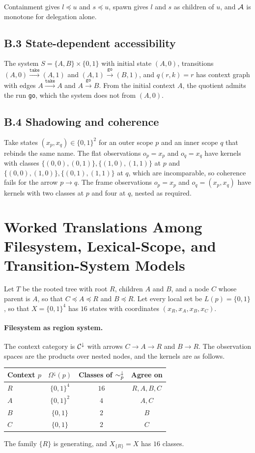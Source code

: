 Containment gives $l\preceq u$ and $s\preceq u$, spawn gives $l$ and $s$ as children of $u$, and $\mathcal A$ is monotone for delegation alone.

\subsection*{B.3 State-dependent accessibility}

The system $S=\{A,B\}\times\{0,1\}$ with initial state $(A,0)$, transitions $(A,0)\xrightarrow{\texttt{take}}(A,1)$ and $(A,1)\xrightarrow{\texttt{go}}(B,1)$, and $q(r,k)=r$ has context graph with edges $A\xrightarrow{\texttt{take}}A$ and $A\xrightarrow{\texttt{go}}B$. From the initial context $A$, the quotient admits the run \texttt{go}, which the system does not from $(A,0)$.

\subsection*{B.4 Shadowing and coherence}

Take states $(x_p,x_q)\in\{0,1\}^2$ for an outer scope $p$ and an inner scope $q$ that rebinds the same name. The flat observations $o_p=x_p$ and $o_q=x_q$ have kernels with classes $\{(0,0),(0,1)\},\{(1,0),(1,1)\}$ at $p$ and $\{(0,0),(1,0)\},\{(0,1),(1,1)\}$ at $q$, which are incomparable, so coherence fails for the arrow $p\to q$. The frame observations $o_p=x_p$ and $o_q=(x_p,x_q)$ have kernels with two classes at $p$ and four at $q$, nested as required.

\section{Worked Translations Among Filesystem, Lexical-Scope, and Transition-System Models}

Let $T$ be the rooted tree with root $R$, children $A$ and $B$, and a node $C$ whose parent is $A$, so that $C\preceq A\preceq R$ and $B\preceq R$. Let every local set be $L(p)=\{0,1\}$, so that $X=\{0,1\}^4$ has $16$ states with coordinates $(x_R,x_A,x_B,x_C)$.

\paragraph{Filesystem as region system.} The context category is $\mathcal C^{\downarrow}$ with arrows $C\to A\to R$ and $B\to R$. The observation spaces are the products over nested nodes, and the kernels are as follows.
\begin{center}
\begin{tabular}{lccc}
\toprule
Context $p$ & $\Omega^{\downarrow}(p)$ & Classes of $\sim^{\downarrow}_p$ & Agree on\\
\midrule
$R$ & $\{0,1\}^4$ & $16$ & $R,A,B,C$\\
$A$ & $\{0,1\}^2$ & $4$ & $A,C$\\
$B$ & $\{0,1\}$ & $2$ & $B$\\
$C$ & $\{0,1\}$ & $2$ & $C$\\
\bottomrule
\end{tabular}
\end{center}
The family $\{R\}$ is generating, and $X_{\{R\}}=X$ has $16$ classes.

